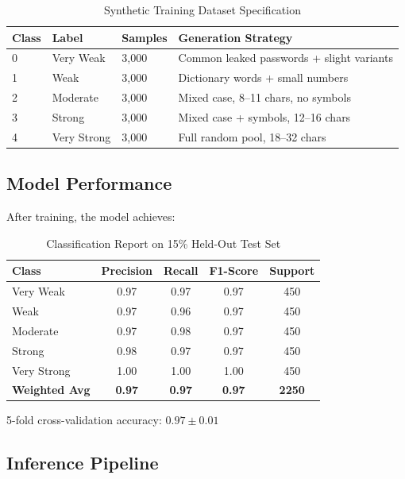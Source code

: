 \documentclass[12pt,a4paper]{article}
\begin{document}
\begin{table}[H]
\centering
\begin{tabular}{lllp{5cm}}
\toprule
\textbf{Class} & \textbf{Label} & \textbf{Samples} & \textbf{Generation Strategy} \\
\midrule
0 & Very Weak  & 3,000 & Common leaked passwords + slight variants \\
1 & Weak       & 3,000 & Dictionary words + small numbers \\
2 & Moderate   & 3,000 & Mixed case, 8--11 chars, no symbols \\
3 & Strong     & 3,000 & Mixed case + symbols, 12--16 chars \\
4 & Very Strong & 3,000 & Full random pool, 18--32 chars \\
\bottomrule
\end{tabular}
\caption{Synthetic Training Dataset Specification}
\end{table}

\subsection{Model Performance}

After training, the model achieves:

\begin{table}[H]
\centering
\begin{tabular}{lcccc}
\toprule
\textbf{Class} & \textbf{Precision} & \textbf{Recall} & \textbf{F1-Score} & \textbf{Support} \\
\midrule
Very Weak   & 0.97 & 0.97 & 0.97 & 450 \\
Weak        & 0.97 & 0.96 & 0.97 & 450 \\
Moderate    & 0.97 & 0.98 & 0.97 & 450 \\
Strong      & 0.98 & 0.97 & 0.97 & 450 \\
Very Strong & 1.00 & 1.00 & 1.00 & 450 \\
\midrule
\textbf{Weighted Avg} & \textbf{0.97} & \textbf{0.97} & \textbf{0.97} & \textbf{2250} \\
\bottomrule
\end{tabular}
\caption{Classification Report on 15\% Held-Out Test Set}
\end{table}

5-fold cross-validation accuracy: $\mathbf{0.97 \pm 0.01}$

\subsection{Inference Pipeline}
\end{document}
